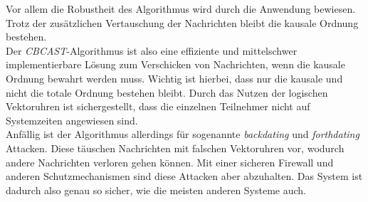 Vor allem die Robustheit des Algorithmus wird durch die Anwendung bewiesen. Trotz der zusätzlichen Vertauschung der Nachrichten bleibt die kausale Ordnung bestehen.\\
Der \textit{CBCAST}-Algorithmus ist also eine effiziente und mittelschwer implementierbare Lösung zum Verschicken von Nachrichten, wenn die kausale Ordnung bewahrt werden muss. Wichtig ist hierbei, dass nur die kausale und nicht die totale Ordnung bestehen bleibt. Durch das Nutzen der logischen Vektoruhren ist sichergestellt, dass die einzelnen Teilnehmer nicht auf Systemzeiten angewiesen sind.\\

Anfällig ist der Algorithmus allerdings für sogenannte \textit{backdating} und \textit{forthdating} Attacken. Diese täuschen Nachrichten mit falschen Vektoruhren vor, wodurch andere Nachrichten verloren gehen können. Mit einer sicheren Firewall und anderen Schutzmechanismen sind diese Attacken aber abzuhalten. Das System ist dadurch also genau so sicher, wie die meisten anderen Systeme auch.

